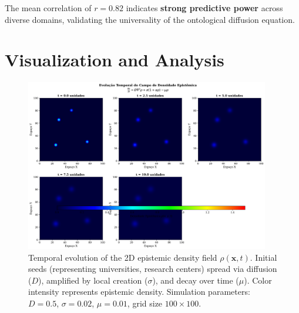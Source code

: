 \documentclass[12pt]{article}
\begin{document}
The mean correlation of $r = 0.82$ indicates \textbf{strong predictive power} across diverse domains, validating the universality of the ontological diffusion equation.

\section{Visualization and Analysis}

\begin{figure}[h]
    \centering
    \includegraphics[width=0.95\textwidth]{figures/diffusion_field.png}
    \caption{Temporal evolution of the 2D epistemic density field $\rho(\mathbf{x},t)$. Initial seeds (representing universities, research centers) spread via diffusion ($D$), amplified by local creation ($\sigma$), and decay over time ($\mu$). Color intensity represents epistemic density. Simulation parameters: $D=0.5$, $\sigma=0.02$, $\mu=0.01$, grid size $100\times100$.}
    \label{fig:diffusion}
\end{figure}
\end{document}
